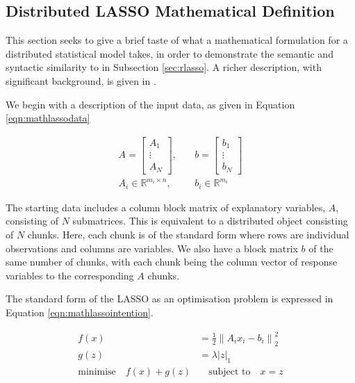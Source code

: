 \documentclass[letterpaper, inpress]{jds} %
\begin{document}
\subsection{Distributed LASSO Mathematical Definition}\label{sec:mathlasso}

This section seeks to give a brief taste of what a mathematical formulation for a distributed statistical model takes, in order to demonstrate the semantic and syntactic similarity to  in Subsection \ref{sec:rlasso}.
A richer description, with significant background, is given in \citet{boyd2011}.

We begin with a description of the input data, as given in Equation \ref{eqn:mathlassodata}

\begin{equation}
\begin{aligned}\label{eqn:mathlassodata}
    A = \begin{bmatrix}
        A_1\\
        \vdots \\
        A_N
    \end{bmatrix},&
    \quad b=\begin{bmatrix}
        b_1\\
        \vdots \\
        b_N
    \end{bmatrix}\\
    A_i \in \mathbb{R}^{m_i\times n},& \quad b_i \in \mathbb{R}^{m_i}
\end{aligned}
\end{equation}

The starting data includes a column block matrix of explanatory variables, $A$, consisting of $N$ submatrices.
This is equivalent to a distributed object consisting of $N$ chunks.
Here, each chunk is of the standard form where rows are individual observations and columns are variables.
We also have a block matrix $b$ of the same number of chunks, with each chunk being the column vector of response variables to the corresponding $A$ chunks.

The standard form of the LASSO as an optimisation problem is expressed in Equation \ref{eqn:mathlassointention}.

\begin{equation}\label{eqn:mathlassointention}
    \begin{aligned}
        f(x) &= \frac{1}{2} \left\| A_i x_i - b_i \right\|^2_2 \\
        g(z) &= \lambda \left| z \right|_1 \\
        \text{minimise} \quad f(x) + g(z) &\quad \text{subject to} \quad x = z
    \end{aligned} 
\end{equation}
\end{document}
